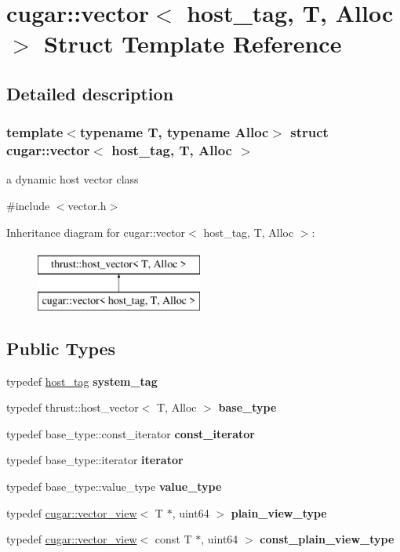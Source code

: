 \hypertarget{structcugar_1_1vector_3_01host__tag_00_01_t_00_01_alloc_01_4}{}\section{cugar\+:\+:vector$<$ host\+\_\+tag, T, Alloc $>$ Struct Template Reference}
\label{structcugar_1_1vector_3_01host__tag_00_01_t_00_01_alloc_01_4}


\subsection{Detailed description}
\subsubsection*{template$<$typename T, typename Alloc$>$\newline
struct cugar\+::vector$<$ host\+\_\+tag, T, Alloc $>$}

a dynamic host vector class 

{\ttfamily \#include $<$vector.\+h$>$}

Inheritance diagram for cugar\+:\+:vector$<$ host\+\_\+tag, T, Alloc $>$\+:\begin{figure}[H]
\begin{center}
\leavevmode
\includegraphics[height=2.000000cm]{structcugar_1_1vector_3_01host__tag_00_01_t_00_01_alloc_01_4}
\end{center}
\end{figure}
\subsection*{Public Types}
\begin{DoxyCompactItemize}
\item 
typedef \hyperlink{structcugar_1_1host__tag}{host\+\_\+tag} {\bfseries system\+\_\+tag}
\item 
typedef thrust\+::host\+\_\+vector$<$ T, Alloc $>$ {\bfseries base\+\_\+type}
\item 
typedef base\+\_\+type\+::const\+\_\+iterator {\bfseries const\+\_\+iterator}
\item 
typedef base\+\_\+type\+::iterator {\bfseries iterator}
\item 
typedef base\+\_\+type\+::value\+\_\+type {\bfseries value\+\_\+type}
\item 
typedef \hyperlink{structcugar_1_1vector__view}{cugar\+::vector\+\_\+view}$<$ T $\ast$, uint64 $>$ {\bfseries plain\+\_\+view\+\_\+type}
\item 
typedef \hyperlink{structcugar_1_1vector__view}{cugar\+::vector\+\_\+view}$<$ const T $\ast$, uint64 $>$ {\bfseries const\+\_\+plain\+\_\+view\+\_\+type}
\end{DoxyCompactItemize}

